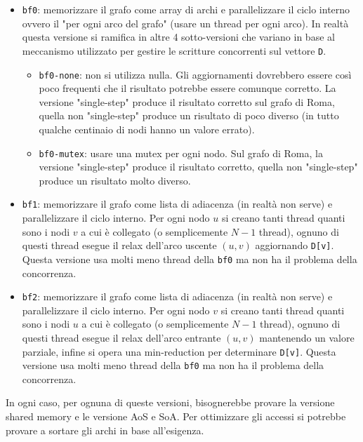 \documentclass[a4paper]{article}
\begin{document}
	\begin{itemize}
		\item \texttt{bf0}: memorizzare il grafo come array di archi e parallelizzare il ciclo interno ovvero il "per ogni arco del grafo" (usare un thread per ogni arco). In realtà questa versione si ramifica in altre 4 sotto-versioni che variano in base al meccanismo utilizzato per gestire le scritture concorrenti sul vettore \texttt{D}.
		\begin{itemize}
			\item \texttt{bf0-none}: non si utilizza nulla. Gli aggiornamenti dovrebbero essere così poco frequenti che il risultato potrebbe essere comunque corretto. La versione "single-step" produce il risultato corretto sul grafo di Roma, quella non "single-step" produce un risultato di poco diverso (in tutto qualche centinaio di nodi hanno un valore errato).
			\item \texttt{bf0-mutex}: usare una mutex per ogni nodo. Sul grafo di Roma, la versione "single-step" produce il risultato corretto, quella non "single-step" produce un risultato molto diverso.
		\end{itemize}
	
		\item \texttt{bf1}: memorizzare il grafo come lista di adiacenza (in realtà non serve) e parallelizzare il ciclo interno. Per ogni nodo $u$ si creano tanti thread quanti sono i nodi $v$ a cui è collegato (o semplicemente $N-1$ thread), ognuno di questi thread esegue il relax dell'arco uscente $(u,v)$ aggiornando \texttt{D[v]}. Questa versione usa molti meno thread della \texttt{bf0} ma non ha il problema della concorrenza.
		
		\item \texttt{bf2}: memorizzare il grafo come lista di adiacenza (in realtà non serve) e parallelizzare il ciclo interno. Per ogni nodo $v$ si creano tanti thread quanti sono i nodi $u$ a cui è collegato (o semplicemente $N-1$ thread), ognuno di questi thread esegue il relax dell'arco entrante $(u,v)$ mantenendo un valore parziale, infine si opera una min-reduction per determinare \texttt{D[v]}. Questa versione usa molti meno thread della \texttt{bf0} ma non ha il problema della concorrenza.
	\end{itemize}

	In ogni caso, per ognuna di queste versioni, bisognerebbe provare la versione shared memory e le versione AoS e SoA. Per ottimizzare gli accessi si potrebbe provare a sortare gli archi in base all'esigenza.
	
\end{document}
